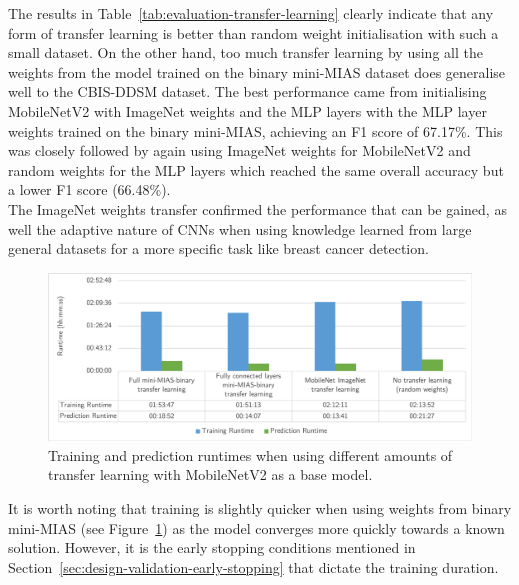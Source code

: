 

The results in Table~\ref{tab:evaluation-transfer-learning} clearly indicate that any form of transfer learning is better than random weight initialisation with such a small dataset. On the other hand, too much transfer learning by using all the weights from the model trained on the binary mini-MIAS dataset does generalise well to the CBIS-DDSM dataset. The best performance came from initialising MobileNetV2 with ImageNet weights and the MLP layers with the MLP layer weights trained on the binary mini-MIAS, achieving an F1 score of 67.17\%. This was closely followed by again using ImageNet weights for MobileNetV2 and random weights for the MLP layers which reached the same overall accuracy but a lower F1 score (66.48\%).\\

The ImageNet weights transfer confirmed the performance that can be gained, as well the adaptive nature of CNNs when using knowledge learned from large general datasets for a more specific task like breast cancer detection.

\begin{figure}[h]
\centerline{\includegraphics[width=\textwidth]{figures/evaluation/transfer_learning_experiment/runtimes.png}}
\caption{\label{fig:evaluation-transfer_learning_experiment-runtimes}Training and prediction runtimes when using different amounts of transfer learning with MobileNetV2 as a base model.}
\end{figure}

It is worth noting that training is slightly quicker when using weights from binary mini-MIAS (see Figure~\ref{fig:evaluation-transfer_learning_experiment-runtimes}) as the model converges more quickly towards a known solution. However, it is the early stopping conditions mentioned in Section~\ref{sec:design-validation-early-stopping} that dictate the training duration.


